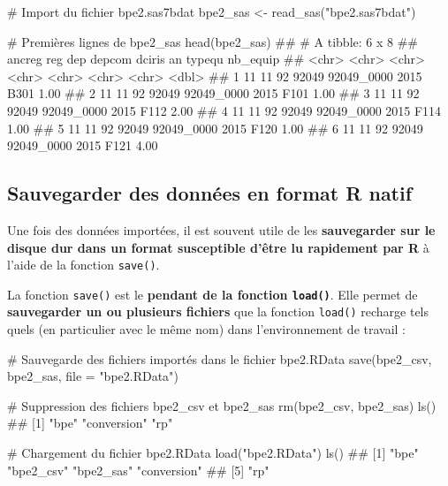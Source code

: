 \documentclass[12pt,twosided, notitlepage]{book}
\newenvironment{Shaded}{}{}
\newcommand{\KeywordTok}[1]{\textcolor[rgb]{0.00,0.00,1.00}{#1}}
\newcommand{\DataTypeTok}[1]{#1}
\newcommand{\StringTok}[1]{\textcolor[rgb]{0.00,0.50,0.50}{#1}}
\newcommand{\CommentTok}[1]{\textcolor[rgb]{0.00,0.50,0.00}{#1}}
\newcommand{\NormalTok}[1]{#1}
\renewenvironment{Shaded}{\begin{snugshade}}{\end{snugshade}}
\begin{document}
\begin{Shaded}
\begin{Highlighting}[]
\CommentTok{# Import du fichier bpe2.sas7bdat}
\NormalTok{bpe2_sas <-}\StringTok{ }\KeywordTok{read_sas}\NormalTok{(}\StringTok{"bpe2.sas7bdat"}\NormalTok{)}

\CommentTok{# Premières lignes de bpe2_sas}
\KeywordTok{head}\NormalTok{(bpe2_sas)}
\NormalTok{  ## # A tibble: 6 x 8}
\NormalTok{  ##   ancreg reg   dep   depcom dciris     an    typequ nb_equip}
\NormalTok{  ##   <chr>  <chr> <chr> <chr>  <chr>      <chr> <chr>     <dbl>}
\NormalTok{  ## 1 11     11    92    92049  92049_0000 2015  B301       1.00}
\NormalTok{  ## 2 11     11    92    92049  92049_0000 2015  F101       1.00}
\NormalTok{  ## 3 11     11    92    92049  92049_0000 2015  F112       2.00}
\NormalTok{  ## 4 11     11    92    92049  92049_0000 2015  F114       1.00}
\NormalTok{  ## 5 11     11    92    92049  92049_0000 2015  F120       1.00}
\NormalTok{  ## 6 11     11    92    92049  92049_0000 2015  F121       4.00}
\end{Highlighting}
\end{Shaded}

\subsection{Sauvegarder des données en format R
natif}\label{sauvegarder-des-donnees-en-format-r-natif}

Une fois des données importées, il est souvent utile de les
\textbf{sauvegarder sur le disque dur dans un format susceptible d'être
lu rapidement par R} à l'aide de la fonction
\texttt{save()}.

La fonction \texttt{save()} est le \textbf{pendant de la fonction
\texttt{load()}}. Elle permet de \textbf{sauvegarder un ou plusieurs
fichiers} que la fonction \texttt{load()} recharge
tels quels (en particulier avec le même nom) dans l'environnement de
travail :

\begin{Shaded}
\begin{Highlighting}[]
\CommentTok{# Sauvegarde des fichiers importés dans le fichier bpe2.RData}
\KeywordTok{save}\NormalTok{(bpe2_csv, bpe2_sas, }\DataTypeTok{file =} \StringTok{"bpe2.RData"}\NormalTok{)}

\CommentTok{# Suppression des fichiers bpe2_csv et bpe2_sas}
\KeywordTok{rm}\NormalTok{(bpe2_csv, bpe2_sas)}
\KeywordTok{ls}\NormalTok{()}
\NormalTok{  ## [1] "bpe"        "conversion" "rp"}

\CommentTok{# Chargement du fichier bpe2.RData}
\KeywordTok{load}\NormalTok{(}\StringTok{"bpe2.RData"}\NormalTok{)}
\KeywordTok{ls}\NormalTok{()}
\NormalTok{  ## [1] "bpe"        "bpe2_csv"   "bpe2_sas"   "conversion"}
\NormalTok{  ## [5] "rp"}
\end{Highlighting}
\end{Shaded}
\end{document}
